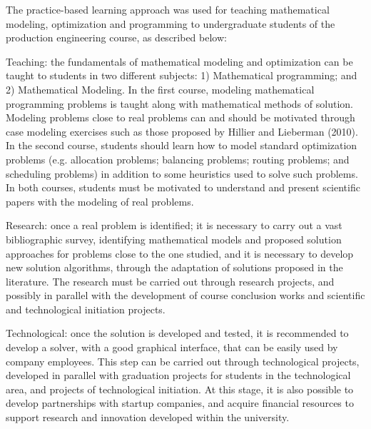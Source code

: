 \documentclass[preprint,12pt,authoryear]{elsarticle}
\begin{document}
The practice-based learning approach was used for teaching mathematical modeling, optimization and programming to undergraduate students of the production engineering course, as described below:

Teaching: the fundamentals of mathematical modeling and optimization can be taught to students in two different subjects: 1) Mathematical programming; and 2) Mathematical Modeling. In the first course, modeling mathematical programming problems is taught along with mathematical methods of solution. Modeling problems close to real problems can and should be motivated through case modeling exercises such as those proposed by Hillier and Lieberman (2010). In the second course, students should learn how to model standard optimization problems (e.g. allocation problems; balancing problems; routing problems; and scheduling problems) in addition to some heuristics used to solve such problems. In both courses, students must be motivated to understand and present scientific papers with the modeling of real problems.

Research: once a real problem is identified; it is necessary to carry out a vast bibliographic survey, identifying mathematical models and proposed solution approaches for problems close to the one studied, and it is necessary to develop new solution algorithms, through the
adaptation of solutions proposed in the literature. The research must be carried out through research projects, and possibly in parallel with the development of course conclusion works and scientific and technological initiation projects.

Technological: once the solution is developed and tested, it is recommended to develop a
solver, with a good graphical interface, that can be easily used by company employees. This
step can be carried out through technological projects, developed in parallel with graduation
projects for students in the technological area, and projects of technological initiation. At this
stage, it is also possible to develop partnerships with startup companies, and acquire financial
resources to support research and innovation developed within the university.



\end{document}
